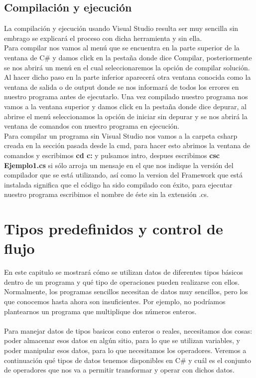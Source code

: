 \documentclass[12pt,a4paper]{report}
\begin{document}
{\section{Compilación y ejecución}
La compilación y ejecución usando Visual Studio resulta ser muy sencilla sin embrago se explicará el proceso con dicha herramienta y sin ella.\\Para compilar nos vamos al menú que se encuentra en la parte superior de la ventana de C\# y damos click en la pestaña donde dice Compilar, posteriormente se nos abrirá un menú en el cual seleccionaremos la opción de compilar solución. Al hacer dicho paso en la parte inferior aparecerá otra ventana conocida como la ventana de salida o de output donde se nos informará de todos los errores en nuestro programa antes de ejecutarlo. Una vez compilado nuestro programa nos vamos a la ventana superior y damos click en la pestaña donde dice depurar, al abrirse el menú seleccionamos la opción de iniciar sin depurar y se nos abrirá la ventana de comandos con nuestro programa en ejecución.\\Para compilar un programa sin Visual Studio nos vamos a la carpeta csharp creada en la sección pasada desde la cmd, para hacer esto abrimos la ventana de comandos y escribimos \textbf{cd c:\csharp} y pulsamos intro, despues escribimos \textbf{csc Ejemplo1.cs} si sólo arroja un mensaje en el que nos indique la versión del compilador que se está utilizando, así como la version del Framework que está instalada significa que el código ha sido compilado con éxito, para ejecutar nuestro programa escribimos el nombre de éste sin la extensión .cs.


\chapter{Tipos predefinidos y control de flujo}
En este capitulo se mostrará cómo se utilizan datos de diferentes tipos básicos dentro de un programa y qué tipo de operaciones pueden realizarse con ellos.\\Normalmente, los programas sencillos necesitan de datos muy sencillos, pero los que conocemos hasta ahora son insuficientes. Por ejemplo, no podríamos plantearnos un programa que multiplique dos números enteros.\\\\Para manejar datos de tipos basicos cono enteros o reales, necesitamos dos cosas: poder almacenar esos datos en algún sitio, para lo que se utilizan variables, y poder manipular esos datos, para lo que necesitamos los operadores. Veremos a continuación qué tipos de datos tenemos disponibles en C\# y cuál es el conjunto de operadores que nos va a permitir transformar y operar con dichos datos.
}
\end{document}
